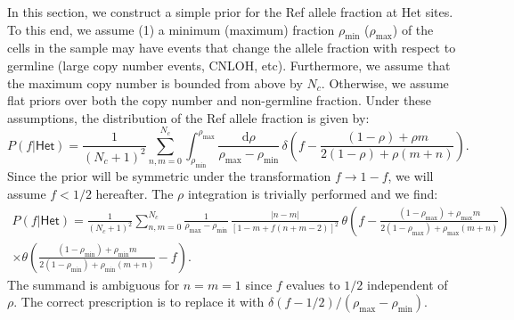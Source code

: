 \documentclass[nofootinbib,amssymb,amsmath]{revtex4}
\begin{document}
 In this section, we construct a simple prior for the Ref allele fraction at Het sites. To this end, we assume (1) a minimum (maximum) fraction $\rho_\mathrm{min}$ ($\rho_\mathrm{max}$) of the cells in the sample may have events that change the allele fraction with respect to germline (large copy number events, CNLOH, etc). Furthermore, we assume that the maximum copy number is bounded from above by $N_c$. Otherwise, we assume flat priors over both the copy number and non-germline fraction. Under these assumptions, the distribution of the Ref allele fraction is given by:
\begin{equation}
P(f|\mathsf{Het}) = \frac{1}{(N_c + 1)^2}\sum_{n,m=0}^{N_c}\int_{\rho_\mathrm{min}}^{\rho_\mathrm{max}}\frac{\mathrm{d}\rho}{\rho_\mathrm{max} - \rho_\mathrm{min}}\,\delta\left(f - \frac{(1-\rho) + \rho m}{2(1-\rho) + \rho(m+n)}\right).
\end{equation}
Since the prior will be symmetric under the transformation $f \rightarrow 1 - f$, we will assume $f<1/2$ hereafter. The $\rho$ integration is trivially performed and we find:
\begin{multline}\label{eq:AFdisc}
P(f|\mathsf{Het}) = \frac{1}{(N_c + 1)^2}\sum_{n,m=0}^{N_c}\frac{1}{\rho_\mathrm{max} - \rho_\mathrm{min}}\,\frac{|n-m|}{[1 - m + f(n+m-2)]^2} \, \theta\left(f - \frac{(1-\rho_\mathrm{max}) + \rho_\mathrm{max} m}{2(1-\rho_\mathrm{max}) + \rho_\mathrm{max}(m+n)}\right) \\
\times \theta\left(\frac{(1-\rho_\mathrm{min}) + \rho_\mathrm{min} m}{2(1-\rho_\mathrm{min}) + \rho_\mathrm{min}(m+n)} - f\right).
\end{multline}
The summand is ambiguous for $n=m=1$ since $f$ evalues to $1/2$ independent of $\rho$. The correct prescription is to replace it with $\delta(f-1/2)/(\rho_\mathrm{max} - \rho_\mathrm{min})$.
\end{document}
